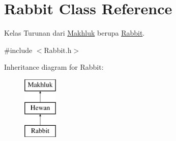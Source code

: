 \hypertarget{class_rabbit}{}\section{Rabbit Class Reference}
\label{class_rabbit}


Kelas Turunan dari \hyperlink{class_makhluk}{Makhluk} berupa \hyperlink{class_rabbit}{Rabbit}.  




{\ttfamily \#include $<$Rabbit.\+h$>$}

Inheritance diagram for Rabbit\+:\begin{figure}[H]
\begin{center}
\leavevmode
\includegraphics[height=3.000000cm]{class_rabbit}
\end{center}
\end{figure}
